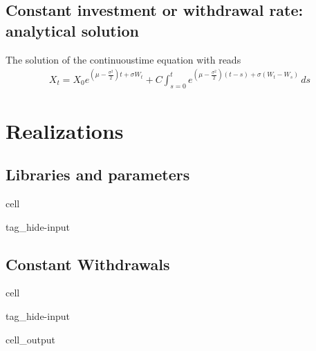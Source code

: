 \documentclass[letterpaper,10pt,english]{jupyterBook}
\begin{document}
\subsection{Constant investment or withdrawal rate: analytical solution}
\label{\detokenize{code/notebooks/sequence-risk:constant-investment-or-withdrawal-rate-analytical-solution}}
\sphinxAtStartPar
The solution of the continuous\sphinxhyphen{}time equation with reads
\begin{equation*}
\begin{split}X_t = X_0 e^{\left( \mu - \frac{\sigma^2}{2} \right) t + \sigma W_t } +  C \int_{s=0}^{t} e^{\left( \mu - \frac{\sigma^2}{2} \right)(t-s) + \sigma (W_t - W_s)} \, ds\end{split}
\end{equation*}

\section{Realizations}
\label{\detokenize{code/notebooks/sequence-risk:realizations}}

\subsection{Libraries and parameters}
\label{\detokenize{code/notebooks/sequence-risk:libraries-and-parameters}}
\begin{sphinxuseclass}{cell}
\begin{sphinxuseclass}{tag_hide-input}
\end{sphinxuseclass}
\end{sphinxuseclass}

\subsection{Constant Withdrawals}
\label{\detokenize{code/notebooks/sequence-risk:constant-withdrawals}}
\begin{sphinxuseclass}{cell}
\begin{sphinxuseclass}{tag_hide-input}\begin{sphinxVerbatimOutput}

\begin{sphinxuseclass}{cell_output}
\noindent{}

\end{sphinxuseclass}\end{sphinxVerbatimOutput}

\end{sphinxuseclass}
\end{sphinxuseclass}
\end{document}
